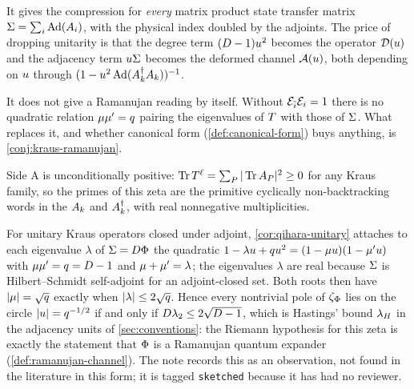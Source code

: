It gives the compression for \emph{every} matrix product state transfer matrix $\Sigma = \sum_i\operatorname{Ad}(A_{i})$, with the physical
index doubled by the adjoints. The price of dropping unitarity is that the degree term $(D-1)u^2$ becomes the operator $\mathcal D(u)$ and the
adjacency term $u\Sigma$ becomes the deformed channel $\mathcal A(u)$, both depending on $u$ through $(1-u^2\operatorname{Ad}(A_{k}^\dagger A_{k}))^{-1}$.

It does not give a Ramanujan reading by itself. Without $\mathcal E_{\bar{i}}\mathcal E_{i} = 1$ there is no quadratic relation $\mu\mu' = q$
pairing the eigenvalues of $T$ with those of $\Sigma$. What replaces it, and whether canonical form (\cref{def:canonical-form}) buys
anything, is \cref{conj:kraus-ramanujan}.

Side A is unconditionally positive: $\operatorname{Tr}T^{\ell} = \sum_{P}|\operatorname{Tr} A_{P}|^2\ge0$ for any Kraus family, so the primes of this
zeta are the primitive cyclically non-backtracking words in the $A_{k}$ and $A_{k}^\dagger$, with real nonnegative multiplicities.

\begin{observation}
\label{obs:rh-iff-ramanujan-channel}
For unitary Kraus operators closed under adjoint, \cref{cor:qihara-unitary} attaches to each eigenvalue $\lambda$ of $\Sigma = D\Phi$ the
quadratic $1-\lambda u+qu^2 = (1-\mu u)(1-\mu'u)$ with $\mu\mu' = q = D-1$ and $\mu+\mu' = \lambda$; the
eigenvalues $\lambda$ are real because $\Sigma$ is Hilbert--Schmidt self-adjoint for an adjoint-closed set. Both roots then have $|\mu| =
\sqrt{q}$ exactly when $|\lambda|\le 2\sqrt{q}$. Hence every nontrivial pole of $\zeta_{\Phi}$ lies on the circle $|u| = q^{-1/2}$ if and
only if $D\lambda_2\le 2\sqrt{D-1}$, which is Hastings' bound $\lambda_H$ \cite{hastings2007random} in the adjacency units of
\cref{sec:conventions}: the Riemann hypothesis for this zeta is exactly the statement that $\Phi$ is a Ramanujan quantum expander
(\cref{def:ramanujan-channel}). The note records this as an observation, not found in the literature in this form; it is tagged
\texttt{sketched} because it has had no reviewer.
\end{observation}
